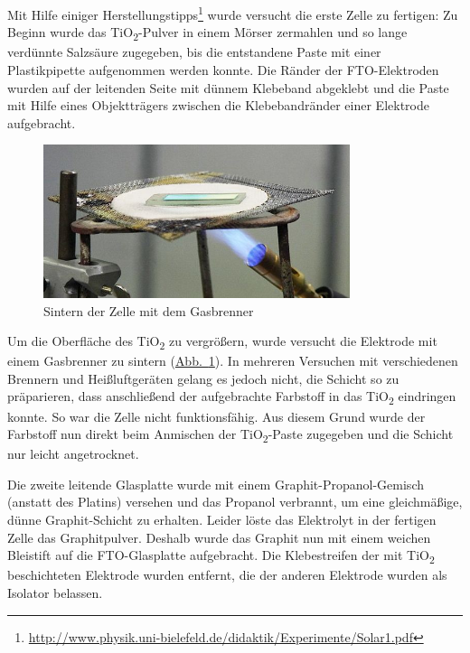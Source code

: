 \documentclass[11pt]{scrartcl}
\begin{document}
Mit Hilfe einiger Herstellungstipps\footnote{\url{http://www.physik.uni-bielefeld.de/didaktik/Experimente/Solar1.pdf}} wurde versucht die erste Zelle zu fertigen: Zu Beginn wurde das TiO\textsubscript{2}-Pulver in einem Mörser zermahlen und so lange verdünnte Salzsäure zugegeben, bis die entstandene Paste mit einer Plastikpipette aufgenommen werden konnte. Die Ränder der FTO-Elektroden wurden auf der leitenden Seite mit dünnem Klebeband abgeklebt und die Paste mit Hilfe eines Objektträgers zwischen die Klebebandränder einer Elektrode aufgebracht.

\begin{figure}[ht]
\begin{center}
\includegraphics[width=0.8\textwidth]{images/brennen.jpg}
\end{center}
\vspace{-1.5\baselineskip}
\caption{Sintern der Zelle mit dem Gasbrenner}
\label{fig:brennen}
\end{figure}

Um die Oberfläche des TiO\textsubscript{2} zu vergrößern, wurde versucht die Elektrode mit einem Gasbrenner zu sintern (\hyperref[fig:brennen]{Abb.~\ref{fig:brennen}}). In mehreren Versuchen mit verschiedenen Brennern und Heißluftgeräten gelang es jedoch nicht, die Schicht so zu präparieren, dass anschließend der aufgebrachte Farbstoff in das TiO\textsubscript{2} eindringen konnte. So war die Zelle nicht funktionsfähig. Aus diesem Grund wurde der Farbstoff nun direkt beim Anmischen der TiO\textsubscript{2}-Paste zugegeben und die Schicht nur leicht angetrocknet.

Die zweite leitende Glasplatte wurde mit einem Graphit-Propanol-Gemisch (anstatt des Platins) versehen und das Propanol verbrannt, um eine gleichmäßige, dünne Graphit-Schicht zu erhalten. Leider löste das Elektrolyt in der fertigen Zelle das Graphitpulver. Deshalb wurde das Graphit nun mit einem weichen Bleistift auf die FTO-Glasplatte aufgebracht. Die Klebestreifen der mit TiO\textsubscript{2} beschichteten Elektrode wurden entfernt, die der anderen Elektrode wurden als Isolator belassen.
\end{document}
